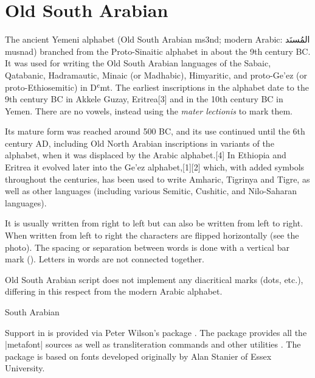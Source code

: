 \section{Old South Arabian}
\label{s:oldsoutharabian}


\newfontfamily{}

The ancient Yemeni alphabet (Old South Arabian ms3nd; modern Arabic: {\arabicfont المُسنَد‎}  musnad) branched from the Proto-Sinaitic alphabet in about the 9th century BC. It was used for writing the Old South Arabian languages of the Sabaic, Qatabanic, Hadramautic, Minaic (or Madhabic), Himyaritic, and proto-Ge'ez (or proto-Ethiosemitic) in Dʿmt. The earliest inscriptions in the alphabet date to the 9th century BC in Akkele Guzay, Eritrea[3] and in the 10th century BC in Yemen. There are no vowels, instead using the \emph{mater lectionis} to mark them.

Its mature form was reached around 500 BC, and its use continued until the 6th century AD, including Old North Arabian inscriptions in variants of the alphabet, when it was displaced by the Arabic alphabet.[4] In Ethiopia and Eritrea it evolved later into the Ge'ez alphabet,[1][2] which, with added symbols throughout the centuries, has been used to write Amharic, Tigrinya and Tigre, as well as other languages (including various Semitic, Cushitic, and Nilo-Saharan languages).

It is usually written from right to left but can also be written from left to right. When written from left to right the characters are flipped horizontally (see the photo).
The spacing or separation between words is done with a vertical bar mark (\textbar).
Letters in words are not connected together.

Old South Arabian script does not implement any diacritical marks (dots, etc.), differing in this respect from the modern Arabic alphabet.

\begin{scriptexample}[]{South Arabian}
\end{scriptexample}

Support in \latexe is provided via Peter Wilson's package \citep{sarabian}. The package provides all the |metafont| sources as well as transliteration commands and other utilities \seedocs{\SARAB}. The package is based on fonts developed originally by Alan Stanier of Essex University.

